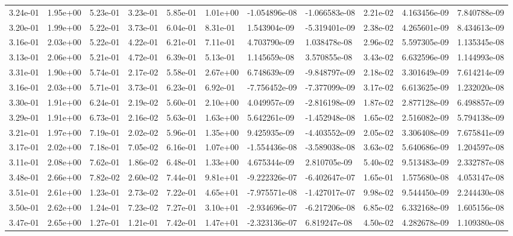 \begin{longtable}{| p{} | p{} |}
3.24e-01 & 1.95e+00 & 5.23e-01 & 3.23e-01 & 5.85e-01 & 1.01e+00 & -1.054896e-08 & -1.066583e-08 &  2.21e-02 &  4.163456e-09 &  7.840788e-09 \\
3.20e-01 & 1.99e+00 & 5.22e-01 & 3.73e-01 & 6.04e-01 & 8.31e-01 &  1.543904e-09 & -5.319401e-09 &  2.38e-02 &  4.265601e-09 &  8.434613e-09 \\
3.16e-01 & 2.03e+00 & 5.22e-01 & 4.22e-01 & 6.21e-01 & 7.11e-01 &  4.703790e-09 &  1.038478e-08 &  2.96e-02 &  5.597305e-09 &  1.135345e-08 \\
3.13e-01 & 2.06e+00 & 5.21e-01 & 4.72e-01 & 6.39e-01 & 5.13e-01 &  1.145659e-08 &  3.570855e-08 &  3.43e-02 &  6.632596e-09 &  1.144993e-08 \\
3.31e-01 & 1.90e+00 & 5.74e-01 & 2.17e-02 & 5.58e-01 & 2.67e+00 &  6.748639e-09 & -9.848797e-09 &  2.18e-02 &  3.301649e-09 &  7.614214e-09 \\
3.16e-01 & 2.03e+00 & 5.71e-01 & 3.73e-01 & 6.23e-01 & 6.92e-01 & -7.756452e-09 & -7.377099e-09 &  3.17e-02 &  6.613625e-09 &  1.232020e-08 \\
3.30e-01 & 1.91e+00 & 6.24e-01 & 2.19e-02 & 5.60e-01 & 2.10e+00 &  4.049957e-09 & -2.816198e-09 &  1.87e-02 &  2.877128e-09 &  6.498857e-09 \\
3.29e-01 & 1.91e+00 & 6.73e-01 & 2.16e-02 & 5.63e-01 & 1.63e+00 &  5.642261e-09 & -1.452948e-08 &  1.65e-02 &  2.516082e-09 &  5.794138e-09 \\
3.21e-01 & 1.97e+00 & 7.19e-01 & 2.02e-02 & 5.96e-01 & 1.35e+00 &  9.425935e-09 & -4.403552e-09 &  2.05e-02 &  3.306408e-09 &  7.675841e-09 \\
3.17e-01 & 2.02e+00 & 7.18e-01 & 7.05e-02 & 6.16e-01 & 1.07e+00 & -1.554436e-08 & -3.589038e-08 &  3.63e-02 &  5.640686e-09 &  1.204597e-08 \\
3.11e-01 & 2.08e+00 & 7.62e-01 & 1.86e-02 & 6.48e-01 & 1.33e+00 &  4.675344e-09 &  2.810705e-09 &  5.40e-02 &  9.513483e-09 &  2.332787e-08 \\
3.48e-01 & 2.66e+00 & 7.82e-02 & 2.60e-02 & 7.44e-01 & 9.81e+01 & -9.222326e-07 & -6.402647e-07 &  1.65e-01 &  1.575680e-08 &  4.053147e-08 \\
3.51e-01 & 2.61e+00 & 1.23e-01 & 2.73e-02 & 7.22e-01 & 4.65e+01 & -7.975571e-08 & -1.427017e-07 &  9.98e-02 &  9.544450e-09 &  2.244430e-08 \\
3.50e-01 & 2.62e+00 & 1.24e-01 & 7.23e-02 & 7.27e-01 & 3.10e+01 & -2.934696e-07 & -6.217206e-08 &  6.85e-02 &  6.332168e-09 &  1.605156e-08 \\
3.47e-01 & 2.65e+00 & 1.27e-01 & 1.21e-01 & 7.42e-01 & 1.47e+01 & -2.323136e-07 &  6.819247e-08 &  4.50e-02 &  4.282678e-09 &  1.109380e-08 \\

\end{longtable}
